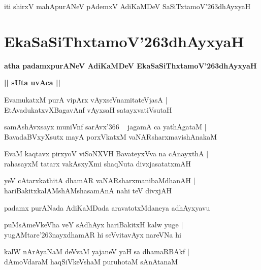 \documentclass[twoside,12pt,openright]{book}
\def\S{\char'263}
\newcounter{shloka}[chapter]
\def\uvaca#1{\centerline{{\large\textbf{#1}}}}
\begin{document}
\begin{center}
iti shirxV mahApurANeV pAdemxV AdiKaMDeV SaSiTxtamoV\S dhAyxyaH 
\end{center}

\chapter{EkaSaSiThxtamoV\S dhAyxyaH}

\begin{center}
{\LARGE\bfseries atha padamxpurANeV AdiKaMDeV EkaSaSiThxtamoV\S dhAyxyaH}
\end{center}

\uvaca{|| sUta uvAca ||}

\begin{shloka}
EvamukatxM purA vipArx vAyxseVnamitateVjasA |\\
EtAvadukatxvXBagavAnf vAyxsaH satayxvatiVsutaH 
\end{shloka}

\begin{shloka}
samAshAvxsayx muniVnf sarAvx\char'366 ~ jagamA ca yathAgataM |\\
BavadaBVxyXsutx mayA porxVkatxM vaNARsharxmavishAnakaM 
\end{shloka}

\begin{shloka}
EvaM kaqtavx pirxyoV viSoNXVH BavateyxVva na cAnayxthA |\\
rahasayxM tatarx vakAsxyXmi shaqNuta divxjasatatxmAH 
\end{shloka}

\begin{shloka}
yeV cAtarxkathitA dhamAR vaNARsharxmanibaMdhanAH |\\
hariBakitxkalAMshAMshasamAnA nahi teV divxjAH 
\end{shloka}

\begin{center}
padamx purANada AdiKaMDada aravatotxMdaneya adhAyxyavu
\end{center}

\begin{shloka}
puMsAmeVkeVha veY sAdhAyx hariBakitxH kalw yuge |\\
yugAMtare\S nayxdhamAR hi seVvitavAyx nareVNa hi 
\end{shloka}

\begin{shloka}
kalW nArAyaNaM deVvaM yajaneV yaH sa dhamaRBAkf |\\
dAmoVdaraM haqSiVkeVshaM puruhotaM sAnAtanaM
\end{shloka}
\end{document}
